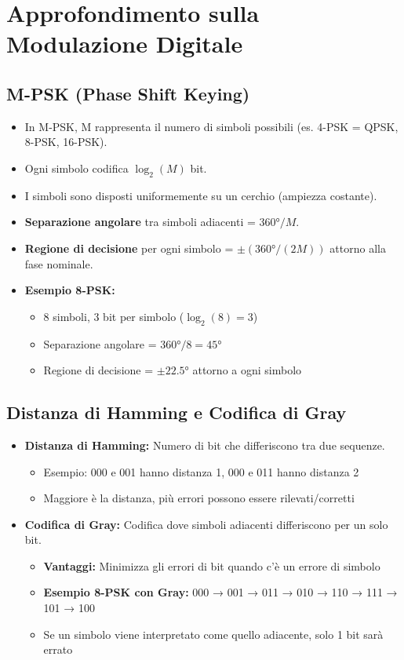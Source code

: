 \section{Approfondimento sulla Modulazione Digitale}

\subsection{M-PSK (Phase Shift Keying)}
\begin{itemize}
    \item In M-PSK, M rappresenta il numero di simboli possibili (es. 4-PSK = QPSK, 8-PSK, 16-PSK).
    \item Ogni simbolo codifica $\log_2(M)$ bit.
    \item I simboli sono disposti uniformemente su un cerchio (ampiezza costante).
    \item \textbf{Separazione angolare} tra simboli adiacenti = $360°/M$.
    \item \textbf{Regione di decisione} per ogni simbolo = $\pm(360°/(2M))$ attorno alla fase nominale.
    \item \textbf{Esempio 8-PSK:}
    \begin{itemize}
        \item 8 simboli, 3 bit per simbolo ($\log_2(8) = 3$)
        \item Separazione angolare = $360°/8 = 45°$
        \item Regione di decisione = $\pm 22.5°$ attorno a ogni simbolo
    \end{itemize}
\end{itemize}

\subsection{Distanza di Hamming e Codifica di Gray}
\begin{itemize}
    \item \textbf{Distanza di Hamming:} Numero di bit che differiscono tra due sequenze.
    \begin{itemize}
        \item Esempio: 000 e 001 hanno distanza 1, 000 e 011 hanno distanza 2
        \item Maggiore è la distanza, più errori possono essere rilevati/corretti
    \end{itemize}
    \item \textbf{Codifica di Gray:} Codifica dove simboli adiacenti differiscono per un solo bit.
    \begin{itemize}
        \item \textbf{Vantaggi:} Minimizza gli errori di bit quando c'è un errore di simbolo
        \item \textbf{Esempio 8-PSK con Gray:} 000 → 001 → 011 → 010 → 110 → 111 → 101 → 100
        \item Se un simbolo viene interpretato come quello adiacente, solo 1 bit sarà errato
    \end{itemize}
\end{itemize}

